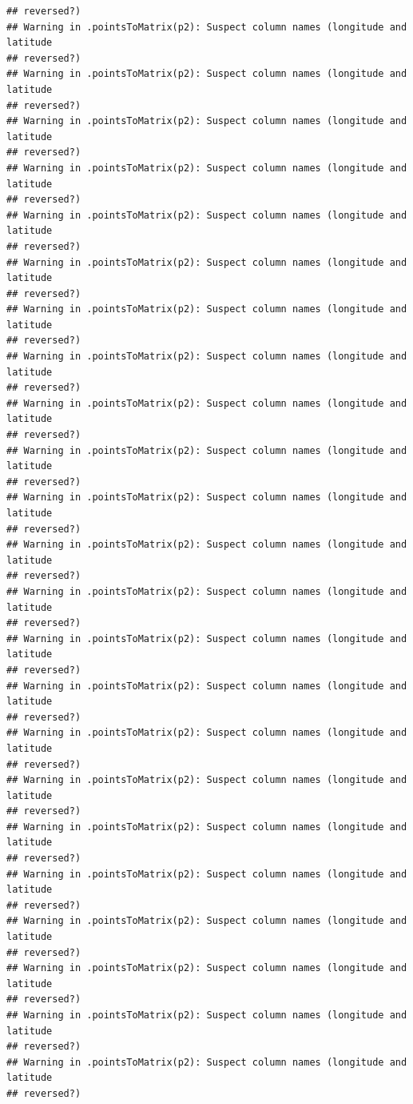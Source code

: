 \documentclass[
]{article}
\begin{document}
\begin{verbatim}
## reversed?)
## Warning in .pointsToMatrix(p2): Suspect column names (longitude and latitude
## reversed?)
## Warning in .pointsToMatrix(p2): Suspect column names (longitude and latitude
## reversed?)
## Warning in .pointsToMatrix(p2): Suspect column names (longitude and latitude
## reversed?)
## Warning in .pointsToMatrix(p2): Suspect column names (longitude and latitude
## reversed?)
## Warning in .pointsToMatrix(p2): Suspect column names (longitude and latitude
## reversed?)
## Warning in .pointsToMatrix(p2): Suspect column names (longitude and latitude
## reversed?)
## Warning in .pointsToMatrix(p2): Suspect column names (longitude and latitude
## reversed?)
## Warning in .pointsToMatrix(p2): Suspect column names (longitude and latitude
## reversed?)
## Warning in .pointsToMatrix(p2): Suspect column names (longitude and latitude
## reversed?)
## Warning in .pointsToMatrix(p2): Suspect column names (longitude and latitude
## reversed?)
## Warning in .pointsToMatrix(p2): Suspect column names (longitude and latitude
## reversed?)
## Warning in .pointsToMatrix(p2): Suspect column names (longitude and latitude
## reversed?)
## Warning in .pointsToMatrix(p2): Suspect column names (longitude and latitude
## reversed?)
## Warning in .pointsToMatrix(p2): Suspect column names (longitude and latitude
## reversed?)
## Warning in .pointsToMatrix(p2): Suspect column names (longitude and latitude
## reversed?)
## Warning in .pointsToMatrix(p2): Suspect column names (longitude and latitude
## reversed?)
## Warning in .pointsToMatrix(p2): Suspect column names (longitude and latitude
## reversed?)
## Warning in .pointsToMatrix(p2): Suspect column names (longitude and latitude
## reversed?)
## Warning in .pointsToMatrix(p2): Suspect column names (longitude and latitude
## reversed?)
## Warning in .pointsToMatrix(p2): Suspect column names (longitude and latitude
## reversed?)
## Warning in .pointsToMatrix(p2): Suspect column names (longitude and latitude
## reversed?)
## Warning in .pointsToMatrix(p2): Suspect column names (longitude and latitude
## reversed?)
## Warning in .pointsToMatrix(p2): Suspect column names (longitude and latitude
## reversed?)
\end{verbatim}
\end{document}
